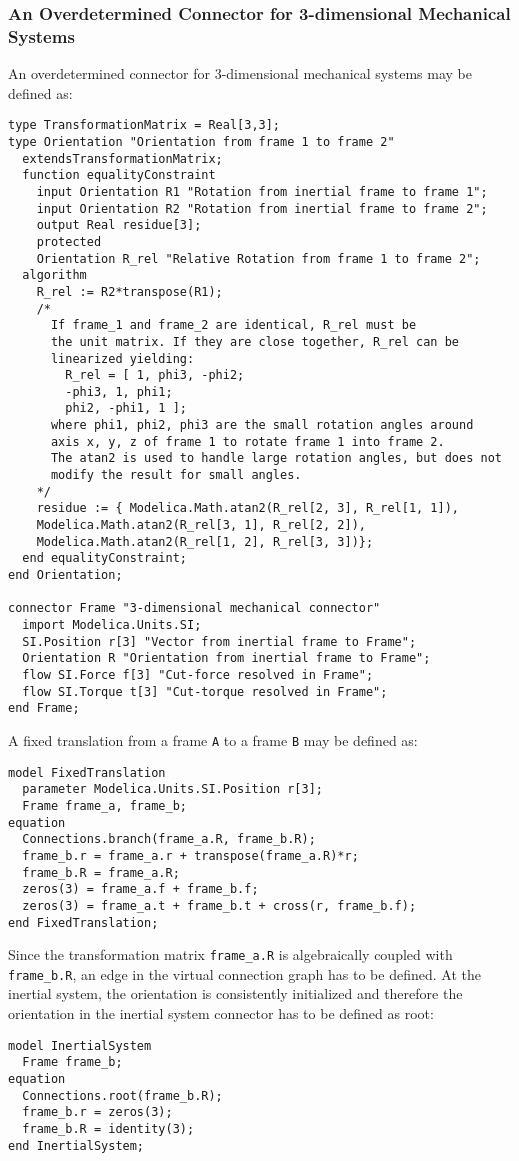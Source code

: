 \subsubsection{An Overdetermined Connector for 3-dimensional Mechanical Systems}

\begin{nonnormative}
An overdetermined connector for 3-dimensional mechanical systems
may be defined as:
\begin{lstlisting}[language=modelica]
type TransformationMatrix = Real[3,3];
type Orientation "Orientation from frame 1 to frame 2"
  extendsTransformationMatrix;
  function equalityConstraint
    input Orientation R1 "Rotation from inertial frame to frame 1";
    input Orientation R2 "Rotation from inertial frame to frame 2";
    output Real residue[3];
    protected
    Orientation R_rel "Relative Rotation from frame 1 to frame 2";
  algorithm
    R_rel := R2*transpose(R1);
    /*
      If frame_1 and frame_2 are identical, R_rel must be
      the unit matrix. If they are close together, R_rel can be
      linearized yielding:
        R_rel = [ 1, phi3, -phi2;
        -phi3, 1, phi1;
        phi2, -phi1, 1 ];
      where phi1, phi2, phi3 are the small rotation angles around
      axis x, y, z of frame 1 to rotate frame 1 into frame 2.
      The atan2 is used to handle large rotation angles, but does not
      modify the result for small angles.
    */
    residue := { Modelica.Math.atan2(R_rel[2, 3], R_rel[1, 1]),
    Modelica.Math.atan2(R_rel[3, 1], R_rel[2, 2]),
    Modelica.Math.atan2(R_rel[1, 2], R_rel[3, 3])};
  end equalityConstraint;
end Orientation;

connector Frame "3-dimensional mechanical connector"
  import Modelica.Units.SI;
  SI.Position r[3] "Vector from inertial frame to Frame";
  Orientation R "Orientation from inertial frame to Frame";
  flow SI.Force f[3] "Cut-force resolved in Frame";
  flow SI.Torque t[3] "Cut-torque resolved in Frame";
end Frame;
\end{lstlisting}
A fixed translation from a frame \lstinline!A! to a frame \lstinline!B! may be defined as:
\begin{lstlisting}[language=modelica]
model FixedTranslation
  parameter Modelica.Units.SI.Position r[3];
  Frame frame_a, frame_b;
equation
  Connections.branch(frame_a.R, frame_b.R);
  frame_b.r = frame_a.r + transpose(frame_a.R)*r;
  frame_b.R = frame_a.R;
  zeros(3) = frame_a.f + frame_b.f;
  zeros(3) = frame_a.t + frame_b.t + cross(r, frame_b.f);
end FixedTranslation;
\end{lstlisting}
Since the transformation matrix \lstinline!frame_a.R! is algebraically
coupled with \lstinline!frame_b.R!, an edge in the virtual connection graph
has to be defined. At the inertial system, the orientation is
consistently initialized and therefore the orientation in the inertial
system connector has to be defined as root:
\begin{lstlisting}[language=modelica]
model InertialSystem
  Frame frame_b;
equation
  Connections.root(frame_b.R);
  frame_b.r = zeros(3);
  frame_b.R = identity(3);
end InertialSystem;
\end{lstlisting}
\end{nonnormative}
